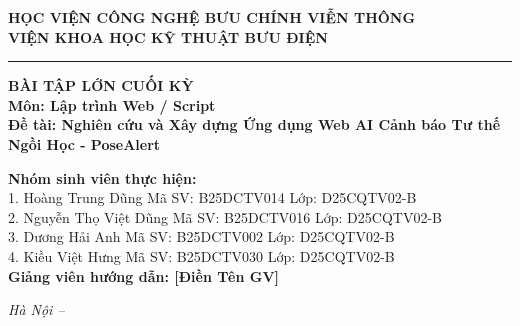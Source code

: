 \documentclass[12pt,a4paper]{report}
\begin{document}
\begin{titlepage}
    \begin{center}
        \textbf{\large HỌC VIỆN CÔNG NGHỆ BƯU CHÍNH VIỄN THÔNG}\\
        \textbf{\large VIỆN KHOA HỌC KỸ THUẬT BƯU ĐIỆN}\\
        \vspace{1.5cm}
        \rule{4cm}{4cm} 
        
        \vspace{1.5cm}
        \textbf{\large BÀI TẬP LỚN CUỐI KỲ}\\
        \textbf{\large Môn: Lập trình Web / Script}\\
        \vspace{1cm}
        \textbf{\huge Đề tài: Nghiên cứu và Xây dựng Ứng dụng Web AI Cảnh báo Tư thế Ngồi Học - PoseAlert}\\
        
        \vspace{3cm}
        \begin{flushleft}
            \hspace{2cm}\textbf{Nhóm sinh viên thực hiện:} \\
            \hspace{2.5cm} 1. Hoàng Trung Dũng \hspace{1cm} Mã SV: B25DCTV014 \hspace{0.5cm} Lớp: D25CQTV02-B\\
            \hspace{2.5cm} 2. Nguyễn Thọ Việt Dũng \hspace{0.5cm} Mã SV: B25DCTV016 \hspace{0.5cm} Lớp: D25CQTV02-B\\
            \hspace{2.5cm} 3. Dương Hải Anh \hspace{1.3cm} Mã SV: B25DCTV002 \hspace{0.5cm} Lớp: D25CQTV02-B\\
            \hspace{2.5cm} 4. Kiều Việt Hưng \hspace{1.3cm} Mã SV: B25DCTV030 \hspace{0.5cm} Lớp: D25CQTV02-B\\
            \vspace{0.5cm}
            \hspace{2cm}\textbf{Giảng viên hướng dẫn: [Điền Tên GV]}\\
        \end{flushleft}
        
        \vfill
        \textit{Hà Nội – \the\year}
    \end{center}
\end{titlepage}
\end{document}
